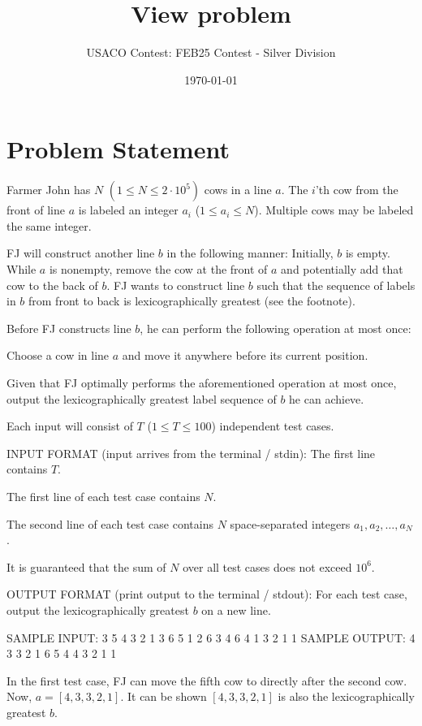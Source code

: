 \documentclass[12pt]{article}
\title{View problem}
\author{USACO Contest: FEB25 Contest - Silver Division}
\date{\today}
\begin{document}
\maketitle

\section*{Problem Statement}


Farmer John has $N$ $(1 \leq N \leq 2 \cdot 10^5)$ cows in a line $a$. The
$i$'th cow from the front of line $a$ is labeled an integer $a_i$
($1 \leq a_i \leq N$). Multiple cows may be labeled the same integer.

FJ will construct another line $b$ in the following manner:
 Initially, $b$ is empty. While $a$ is nonempty, remove the cow at the front of $a$ and potentially
add that cow to the back of $b$.
FJ wants to construct line $b$ such that the sequence of labels in $b$ from
front to back is lexicographically greatest (see the footnote).

Before FJ constructs line $b$, he can perform the following operation at most
once:

 Choose a cow in line $a$ and move it anywhere before its current position.

Given that FJ optimally performs the aforementioned operation at most once,
output the lexicographically greatest label sequence of $b$ he can achieve.


Each input will consist of $T$ ($1 \leq T \leq 100$) independent test cases.

INPUT FORMAT (input arrives from the terminal / stdin):
The first line contains $T$.

The first line of each test case contains $N$.

The second line of each test case contains $N$ space-separated integers
$a_1, a_2, \ldots, a_N$.

It is guaranteed that the sum of $N$ over all test cases does not exceed $10^6$.

OUTPUT FORMAT (print output to the terminal / stdout):
For each test case, output the lexicographically greatest $b$ on a new line.

SAMPLE INPUT:
3
5
4 3 2 1 3
6
5 1 2 6 3 4
6
4 1 3 2 1 1
SAMPLE OUTPUT: 
4 3 3 2 1
6 5 4
4 3 2 1 1

In the first test case, FJ can move the fifth cow to directly after the second
cow. Now, $a = [4, 3, 3, 2, 1]$. It can be shown $[4, 3, 3, 2, 1]$ is also the
lexicographically greatest $b$. 
\end{document}
